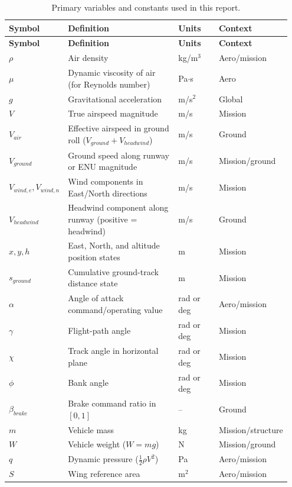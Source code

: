 ﻿\documentclass[11pt]{article}
\begin{document}
\begin{longtable}{p{0.15\linewidth} p{0.50\linewidth} p{0.18\linewidth} p{0.12\linewidth}}
\caption{Primary variables and constants used in this report.}\label{tab:nomenclature}\\
\toprule
\textbf{Symbol} & \textbf{Definition} & \textbf{Units} & \textbf{Context} \\
\midrule
\endfirsthead
\toprule
\textbf{Symbol} & \textbf{Definition} & \textbf{Units} & \textbf{Context} \\
\midrule
\endhead
\(\rho\) & Air density & kg/m\(^3\) & Aero/mission \\
\(\mu\) & Dynamic viscosity of air (for Reynolds number) & Pa\(\cdot\)s & Aero \\
\(g\) & Gravitational acceleration & m/s\(^2\) & Global \\
\(V\) & True airspeed magnitude & m/s & Mission \\
\(V_{air}\) & Effective airspeed in ground roll (\(V_{ground}+V_{headwind}\)) & m/s & Ground \\
\(V_{ground}\) & Ground speed along runway or ENU magnitude & m/s & Mission/ground \\
\(V_{wind,e}, V_{wind,n}\) & Wind components in East/North directions & m/s & Mission \\
\(V_{headwind}\) & Headwind component along runway (positive = headwind) & m/s & Ground \\
\(x,y,h\) & East, North, and altitude position states & m & Mission \\
\(s_{ground}\) & Cumulative ground-track distance state & m & Mission \\
\(\alpha\) & Angle of attack command/operating value & rad or deg & Aero/mission \\
\(\gamma\) & Flight-path angle & rad or deg & Mission \\
\(\chi\) & Track angle in horizontal plane & rad or deg & Mission \\
\(\phi\) & Bank angle & rad or deg & Mission \\
\(\beta_{brake}\) & Brake command ratio in \([0,1]\) & -- & Ground \\
\(m\) & Vehicle mass & kg & Mission/structure \\
\(W\) & Vehicle weight (\(W=mg\)) & N & Mission/ground \\
\(q\) & Dynamic pressure (\(\tfrac12 \rho V^2\)) & Pa & Aero/mission \\
\(S\) & Wing reference area & m\(^2\) & Aero/mission \\

\end{longtable}
\end{document}
